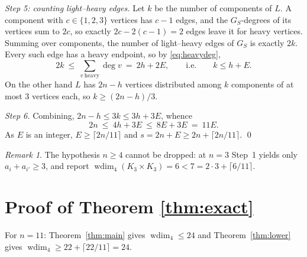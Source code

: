 \documentclass[11pt]{amsart}
\theoremstyle{remark}
\newtheorem*{remark}{Remark}
\DeclareMathOperator{\wdim}{wdim}
\begin{document}
\emph{Step 5: counting light--heavy edges.} Let $k$ be the number of
components of $L$. A component with $c\in\{1,2,3\}$ vertices has $c-1$ edges,
and the $G_S$-degrees of its vertices sum to $2c$, so exactly
$2c-2(c-1)=2$ edges leave it for heavy vertices. Summing over components, the
number of light--heavy edges of $G_S$ is exactly $2k$. Every such edge has a
heavy endpoint, so by \eqref{eq:heavydeg},
\[
  2k\ \le\ \sum_{v\ \mathrm{heavy}}\deg v\ =\ 2h+2E ,
  \qquad\text{i.e.}\qquad k\le h+E .
\]
On the other hand $L$ has $2n-h$ vertices distributed among $k$ components of
at most $3$ vertices each, so $k\ge(2n-h)/3$.

\emph{Step 6.} Combining, $2n-h\le3k\le3h+3E$, whence
\[
  2n\ \le\ 4h+3E\ \le\ 8E+3E\ =\ 11E .
\]
As $E$ is an integer, $E\ge\lceil2n/11\rceil$ and
$s=2n+E\ge2n+\lceil2n/11\rceil$. \qed

\begin{remark}
The hypothesis $n\ge4$ cannot be dropped: at $n=3$ Step~1 yields only
$a_i+a_{i'}\ge3$, and \cite{FKY} report
$\wdim_4(K_3\times K_3)=6<7=2\cdot3+\lceil6/11\rceil$.
\end{remark}

\section{Proof of Theorem \ref{thm:exact}}\label{sec:exact}

For $n=11$: Theorem~\ref{thm:main} gives $\wdim_4\le24$ and
Theorem~\ref{thm:lower} gives $\wdim_4\ge22+\lceil22/11\rceil=24$.
\end{document}
